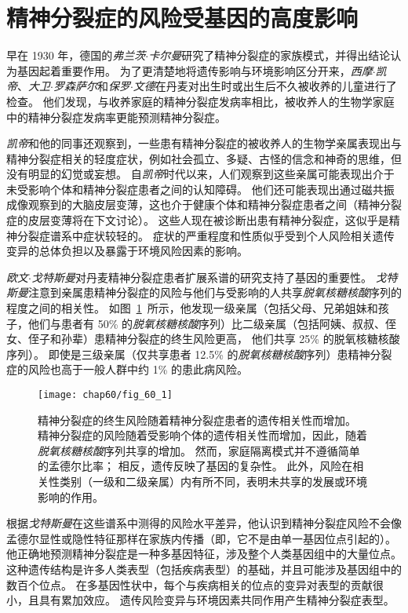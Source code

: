 \section{精神分裂症的风险受基因的高度影响}

早在 1930 年，德国的\textit{弗兰茨$\cdot$卡尔曼}研究了精神分裂症的家族模式，并得出结论认为基因起着重要作用。
为了更清楚地将遗传影响与环境影响区分开来，\textit{西摩$\cdot$凯帝}、\textit{大卫$\cdot$罗森萨尔}和\textit{保罗$\cdot$文德}在丹麦对出生时或出生后不久被收养的儿童进行了检查。
他们发现，与收养家庭的精神分裂症发病率相比，被收养人的生物学家庭中的精神分裂症发病率更能预测精神分裂症。


\textit{凯帝}和他的同事还观察到，一些患有精神分裂症的被收养人的生物学亲属表现出与精神分裂症相关的轻度症状，例如社会孤立、多疑、古怪的信念和神奇的思维，但没有明显的幻觉或妄想。
自\textit{凯帝}时代以来，人们观察到这些亲属可能表现出介于未受影响个体和精神分裂症患者之间的认知障碍。
他们还可能表现出通过磁共振成像观察到的大脑皮层变薄，这也介于健康个体和精神分裂症患者之间（精神分裂症的皮层变薄将在下文讨论）。
这些人现在被诊断出患有精神分裂症，这似乎是精神分裂症谱系中症状较轻的。
症状的严重程度和性质似乎受到个人风险相关遗传变异的总体负担以及暴露于环境风险因素的影响。


\textit{欧文$\cdot$戈特斯曼}对丹麦精神分裂症患者扩展系谱的研究支持了基因的重要性。
\textit{戈特斯曼}注意到亲属患精神分裂症的风险与他们与受影响的人共享\textit{脱氧核糖核酸}序列的程度之间的相关性。
如图~\ref{fig:60_1}~所示，他发现一级亲属（包括父母、兄弟姐妹和孩子，他们与患者有 50\% 的\textit{脱氧核糖核酸}序列）比二级亲属（包括阿姨、叔叔、侄女、侄子和孙辈）患精神分裂症的终生风险更高， 他们共享 25\% 的脱氧核糖核酸序列）。
即使是三级亲属（仅共享患者 12.5\% 的\textit{脱氧核糖核酸}序列）患精神分裂症的风险也高于一般人群中约 1\% 的患此病风险。


\begin{figure}[htbp]
	\centering
	\texttt{[image: chap60/fig\_60\_1]}
	\caption{精神分裂症的终生风险随着精神分裂症患者的遗传相关性而增加。
		精神分裂症的风险随着受影响个体的遗传相关性而增加，因此，随着\textit{脱氧核糖核酸}序列共享的增加。
		然而，家庭隔离模式并不遵循简单的孟德尔比率；
		相反，遗传反映了基因的复杂性。
		此外，风险在相关性类别（一级和二级亲属）内有所不同，表明未共享的发展或环境影响的作用\cite{gottesman1991schizophrenia}。}
	\label{fig:60_1}
\end{figure}


根据\textit{戈特斯曼}在这些谱系中测得的风险水平差异，他认识到精神分裂症风险不会像孟德尔显性或隐性特征那样在家族内传播（即，它不是由单一基因位点引起的）。
他正确地预测精神分裂症是一种多基因特征，涉及整个人类基因组中的大量位点。
这种遗传结构是许多人类表型（包括疾病表型）的基础，并且可能涉及基因组中的数百个位点。
在多基因性状中，每个与疾病相关的位点的变异对表型的贡献很小，且具有累加效应。
遗传风险变异与环境因素共同作用产生精神分裂症表型。


